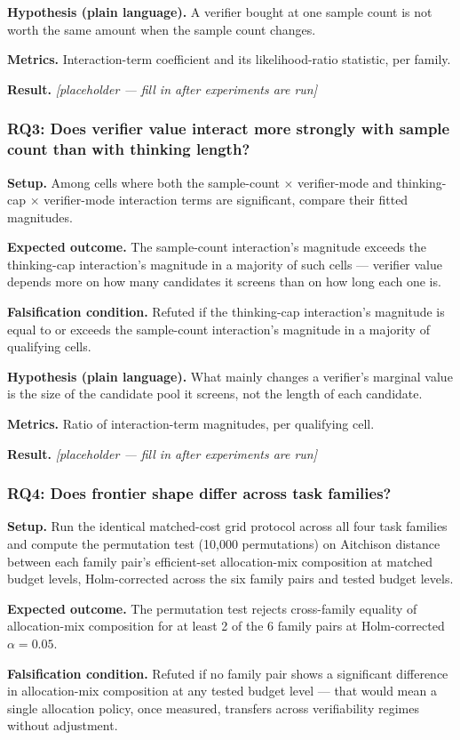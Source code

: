\documentclass[11pt]{article}
\newcommand{\ph}{\textit{[placeholder --- fill in after experiments are run]}}
\begin{document}
\textbf{Hypothesis (plain language).} A verifier bought at one sample count is not worth the same amount when the sample count changes.

\textbf{Metrics.} Interaction-term coefficient and its likelihood-ratio statistic, per family.

\textbf{Result.} \ph

\subsubsection{RQ3: Does verifier value interact more strongly with sample count than with thinking length?}
\textbf{Setup.} Among cells where both the sample-count $\times$ verifier-mode and thinking-cap $\times$ verifier-mode interaction terms are significant, compare their fitted magnitudes.

\textbf{Expected outcome.} The sample-count interaction's magnitude exceeds the thinking-cap interaction's magnitude in a majority of such cells --- verifier value depends more on how many candidates it screens than on how long each one is.

\textbf{Falsification condition.} Refuted if the thinking-cap interaction's magnitude is equal to or exceeds the sample-count interaction's magnitude in a majority of qualifying cells.

\textbf{Hypothesis (plain language).} What mainly changes a verifier's marginal value is the size of the candidate pool it screens, not the length of each candidate.

\textbf{Metrics.} Ratio of interaction-term magnitudes, per qualifying cell.

\textbf{Result.} \ph

\subsubsection{RQ4: Does frontier shape differ across task families?}
\textbf{Setup.} Run the identical matched-cost grid protocol across all four task families and compute the permutation test (10,000 permutations) on Aitchison distance between each family pair's efficient-set allocation-mix composition at matched budget levels, Holm-corrected across the six family pairs and tested budget levels.

\textbf{Expected outcome.} The permutation test rejects cross-family equality of allocation-mix composition for at least 2 of the 6 family pairs at Holm-corrected $\alpha = 0.05$.

\textbf{Falsification condition.} Refuted if no family pair shows a significant difference in allocation-mix composition at any tested budget level --- that would mean a single allocation policy, once measured, transfers across verifiability regimes without adjustment.
\end{document}
